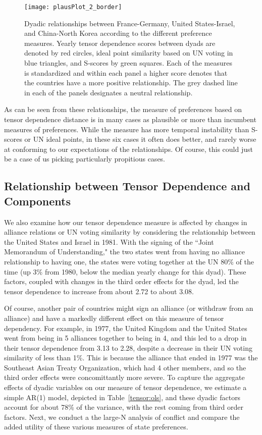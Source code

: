 \begin{figure}
	\centering
	\texttt{[image: plausPlot\_2\_border]}
	\caption{Dyadic relationships between France-Germany, United States-Israel, and China-North Korea according to the different preference measures. Yearly tensor dependence scores between dyads are denoted by red circles, ideal point similarity based on UN voting in blue triangles, and S-scores by green squares. Each of the measures is standardized and within each panel a higher score denotes that the countries have a more positive relationship. The grey dashed line in each of the panels designates a neutral relationship.}
	\label{unfriendly:dyads}
\end{figure}

As can be seen from these relationships, the measure of preferences based on tensor dependence distance is in many cases as plausible or more than incumbent measures of preferences. While the measure has more temporal instability than S-scores or UN ideal points, in these six cases it often does better, and rarely worse at conforming to our expectations of the relationships. Of course, this could just be a case of us picking particularly propitious cases.

\subsection*{Relationship between Tensor Dependence and Components}

We also examine how our tensor dependence measure is affected by changes in alliance relations or UN voting similarity by considering the relationship between the United States and Israel in 1981. With the signing of the ``Joint Memorandum of Understanding," the two states went from having no alliance relationship to having one, the states were voting together at the UN 80\% of the time (up 3\% from 1980, below the median yearly change for this dyad). These factors, coupled with changes in the third order effects for the dyad, led the tensor dependence to increase from about 2.72 to about 3.08.

Of course, another pair of countries might sign an alliance (or withdraw from an alliance) and have a markedly different effect on this measure of tensor dependency. For example, in 1977, the United Kingdom and the United States went from being in 5 alliances together to being in 4, and this led to a drop in their tensor dependence from 3.13 to 2.28, despite a decrease in their UN voting similarity of less than 1\%. This is because the alliance that ended in 1977 was the Southeast Asian Treaty Organization, which had 4 other members, and so the third order effects were concomittantly more severe. To capture the aggregate effects of dyadic variables on our measure of tensor dependence, we estimate a simple AR(1) model, depicted in Table~\ref{tensor:ols}, and these dyadic factors account for about 78\% of the variance, with the rest coming from third order factors. Next, we conduct a the large-N analysis of conflict and compare the added utility of these various measures of state preferences.

